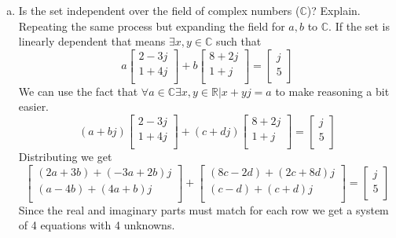 \documentclass{article}
\begin{document}
\begin{enumerate}[a)]
\item Is the set independent over the field of complex numbers ($\mathbb{C}$)? Explain.
\newline
\newline
Repeating the same process but expanding the field for $a,b$ to $\mathbb{C}$.
If the set is linearly dependent that means $\exists x,y \in \mathbb{C}$ such that
$$
a
\begin{bmatrix}
2-3j \\
1+4j \\
\end{bmatrix}
+b
\begin{bmatrix}
8+2j \\
1+j \\
\end{bmatrix}
=
\begin{bmatrix}
j \\
5 \\
\end{bmatrix}
$$
We can use the fact that $\forall a \in \mathbb{C} \exists x,y \in \mathbb{R} | x+yj=a$ to make reasoning a bit easier.
$$
(a+bj)
\begin{bmatrix}
2-3j \\
1+4j \\
\end{bmatrix}
+(c+dj)
\begin{bmatrix}
8+2j \\
1+j \\
\end{bmatrix}
=
\begin{bmatrix}
j \\
5 \\
\end{bmatrix}
$$
Distributing we get
$$
\begin{bmatrix}
(2a+3b)+(-3a+2b)j \\
(a-4b)+(4a+b)j \\
\end{bmatrix}
+
\begin{bmatrix}
(8c-2d)+(2c+8d)j \\
(c-d)+(c+d)j \\
\end{bmatrix}
=
\begin{bmatrix}
j \\
5 \\
\end{bmatrix}
$$
Since the real and imaginary parts must match for each row we get a system of 4 equations with 4 unknowns.
\begin{align*}

\end{align*}
\end{enumerate}
\end{document}
